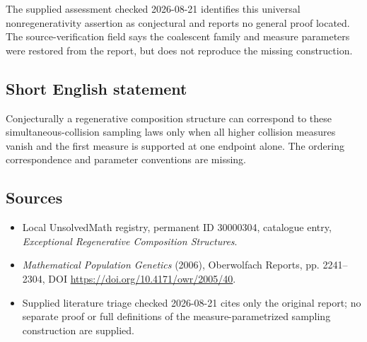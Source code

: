 \documentclass[11pt]{article}
\begin{document}
The supplied assessment checked 2026-08-21 identifies this universal nonregenerativity assertion as conjectural and reports no general proof located. The source-verification field says the coalescent family and measure parameters were restored from the report, but does not reproduce the missing construction.
\subsection{Short English statement}
Conjecturally a regenerative composition structure can correspond to these simultaneous-collision sampling laws only when all higher collision measures vanish and the first measure is supported at one endpoint alone. The ordering correspondence and parameter conventions are missing.
\subsection{Sources}
\begin{itemize}
\item Local UnsolvedMath registry, permanent ID 30000304, catalogue entry, \emph{Exceptional Regenerative Composition Structures}.
\item \emph{Mathematical Population Genetics} (2006), Oberwolfach Reports, pp. 2241--2304, DOI \url{https://doi.org/10.4171/owr/2005/40}.
\item Supplied literature triage checked 2026-08-21 cites only the original report; no separate proof or full definitions of the measure-parametrized sampling construction are supplied.
\end{itemize}
\end{document}
